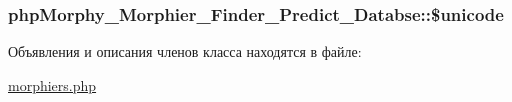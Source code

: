 \label{classphpMorphy__Morphier__Finder__Predict__Databse_ae82d5988dd8d0037387c65122dbc39f8}
\hypertarget{classphpMorphy__Morphier__Finder__Predict__Databse_a21d2948e96243f8cc7dea4b054800df0}{
\subsubsection[{\$unicode}]{\setlength{\rightskip}{0pt plus 5cm}phpMorphy\_\-Morphier\_\-Finder\_\-Predict\_\-Databse::\$unicode}}
\label{classphpMorphy__Morphier__Finder__Predict__Databse_a21d2948e96243f8cc7dea4b054800df0}


Объявления и описания членов класса находятся в файле:\begin{DoxyCompactItemize}
\item 
\hyperlink{morphiers_8php}{morphiers.php}\end{DoxyCompactItemize}
